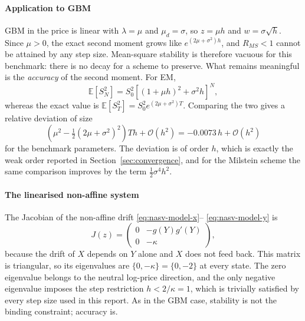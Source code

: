 \documentclass[11pt,a4paper]{article}
\theoremstyle{definition}
\theoremstyle{remark}
\begin{document}
\paragraph{Application to GBM}
GBM in the price is linear with $\lambda = \mu$ and $\mu_d = \sigma$, so
$z = \mu h$ and $w = \sigma \sqrt{h}$. Since $\mu > 0$, the exact second moment
grows like $e^{(2\mu + \sigma^2) h}$, and $R_{MS} < 1$ cannot be attained by any
step size. Mean-square stability is therefore vacuous for this benchmark: there
is no decay for a scheme to preserve. What remains meaningful is the
\emph{accuracy} of the second moment. For EM,
\begin{equation}
    \mathbb{E}\!\left[ S_N^2 \right] = S_0^2
    \left[ (1 + \mu h)^2 + \sigma^2 h \right]^{N},
    \label{eq:second-moment-em}
\end{equation}
whereas the exact value is
$\mathbb{E}[S_T^2] = S_0^2 e^{(2\mu + \sigma^2) T}$. Comparing the two gives a
relative deviation of size
\begin{equation}
    \left( \mu^2 - \tfrac12 (2\mu + \sigma^2)^2 \right) T h
    + \mathcal{O}(h^2) = -0.0073\, h + \mathcal{O}(h^2)
    \label{eq:second-moment-bias}
\end{equation}
for the benchmark parameters. The deviation is of order $h$, which is exactly
the weak order reported in Section~\ref{sec:convergence}, and for the Milstein
scheme the same comparison improves by the term $\tfrac12\sigma^4h^2$.

\paragraph{The linearised non-affine system}
The Jacobian of the non-affine drift \eqref{eq:nasv-model-x}--%
\eqref{eq:nasv-model-y} is
\begin{equation}
    J(z) =
    \begin{pmatrix}
        0 & -g(Y) g'(Y) \\
        0 & -\kappa
    \end{pmatrix},
    \label{eq:jacobian-nasv}
\end{equation}
because the drift of $X$ depends on $Y$ alone and $X$ does not feed back. This
matrix is triangular, so its eigenvalues are $\{0, -\kappa\} = \{0, -2\}$ at
every state. The zero eigenvalue belongs to the neutral log-price direction,
and the only negative eigenvalue imposes the step restriction
$h < 2/\kappa = 1$, which is trivially satisfied by every step size used in
this report. As in the GBM case, stability is not the binding constraint;
accuracy is.
\end{document}
